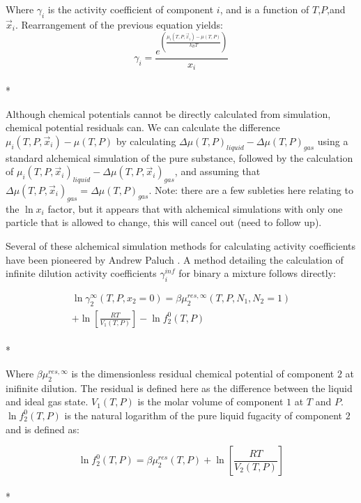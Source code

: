 \documentclass[9pt,bestpractices]{livecoms}
\begin{document}
Where $\gamma_i$ is the activity coefficient of component $i$, and is
a function of $T$,$P$,and $\vec{x}_i$.  Rearrangement of the previous
equation yields:
\begin{equation}\gamma_i = \frac{e^{\left(\frac{\mu_i(T,P,\vec{x}_i) - \mu(T,P)}{k_B T}\right)}}{x_i}\end{equation}\\*

Although chemical potentials cannot be directly calculated from
simulation, chemical potential residuals can. We can calculate the
difference $\mu_i(T,P,\vec{x}_i) - \mu(T,P)$ by calculating $\Delta
\mu(T,P)_{liquid} - \Delta \mu(T,P)_{gas}$ using a standard alchemical
simulation of the pure substance, followed by the calculation of
$\mu_i(T,P,\vec{x}_i)_{liquid} - \Delta \mu(T,P,\vec{x}_i)_{gas}$, and
assuming that $\Delta \mu(T,P,\vec{x}_i)_{gas} = \Delta
\mu(T,P)_{gas}$. Note: there are a few subleties here relating to the
$\ln x_i$ factor, but it appears that with alchemical simulations with
only one particle that is allowed to change, this will cancel out
(need to follow up).

Several of these alchemical simulation methods for calculating activity coefficients have been pioneered by Andrew Paluch \cite{paluch1}. A method detailing the calculation of infinite dilution activity coefficients $\gamma_i^{inf}$ for binary a mixture follows directly:

\begin{multline}
\ln\gamma_2^{\infty}\left(T,P,x_2 = 0\right) = \beta \mu_2^{res,\infty}\left(T,P,N_1,N_2 = 1\right) \\ + \ln\left[\frac{R T}{V_1\left(T,P\right)}\right] - \ln f_2^0\left(T,P\right)
\end{multline}\\*

Where $\beta\mu_2^{res,\infty}$ is the dimensionless residual chemical potential of component $2$ at inifinite dilution. The residual is defined here as the difference between the liquid and ideal gas state. $V_1\left(T,P\right)$ is the molar volume of component $1$ at $T$ and $P$. $\ln f_2^0\left(T,P\right)$ is the natural logarithm of the pure liquid fugacity of component $2$ and is defined as:

\begin{equation}\ln f_2^0\left(T,P\right) = \beta\mu_2^{res}\left(T,P\right) + \ln\left[\frac{R T}{V_2\left(T,P\right)}\right]\end{equation}\\*
\end{document}
